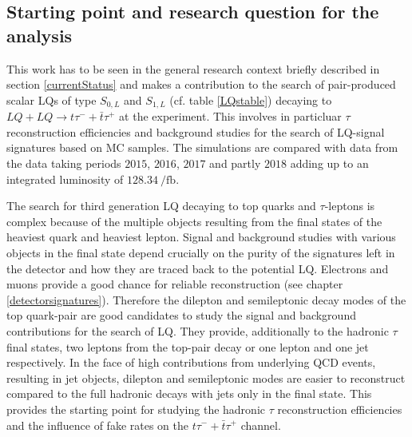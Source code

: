 \subsection{Starting point and research question for the analysis}
This work has to be seen in the general research context briefly described in section \ref{currentStatus} and makes a contribution to the search of pair-produced scalar LQs of type $S_{0,L}$ and $S_{1,L}$ (cf. table \ref{LQstable}) decaying to $LQ+LQ\rightarrow t\tau^{-}+\bar{t}\tau^{+}$ at the {\ATLAS} experiment. This involves in particluar $\tau$ reconstruction efficiencies and background studies for the search of LQ-signal signatures based on MC samples. The simulations are compared with data from the data taking periods $2015$, $2016$, $2017$ and partly $2018$ adding up to an integrated luminosity of $\SI{128.34}{\per\femto\barn}$.\par   
The search for third generation LQ decaying to top quarks and $\tau$-leptons is complex because of the multiple objects resulting from the final states of the heaviest quark and heaviest lepton. 
\newline
Signal and background studies with various objects in the final state depend crucially on the purity of the signatures left in the detector and how they are traced back to the potential LQ. Electrons and muons provide a good chance for reliable reconstruction (see chapter \ref{detectorsignatures}). Therefore the dilepton and semileptonic decay modes of the top quark-pair are good candidates to study the signal and background contributions for the search of LQ. They provide, additionally to the hadronic $\tau$ final states, two leptons from the top-pair decay or one lepton and one jet respectively. In the face of high contributions from underlying QCD events, resulting in jet objects, dilepton and semileptonic modes are easier to reconstruct compared to the full hadronic decays with jets only in the final state. This provides the starting point for studying the hadronic $\tau$ reconstruction efficiencies and the influence of fake rates on the $t\tau^{-}+\bar{t}\tau^{+}$ channel. 
